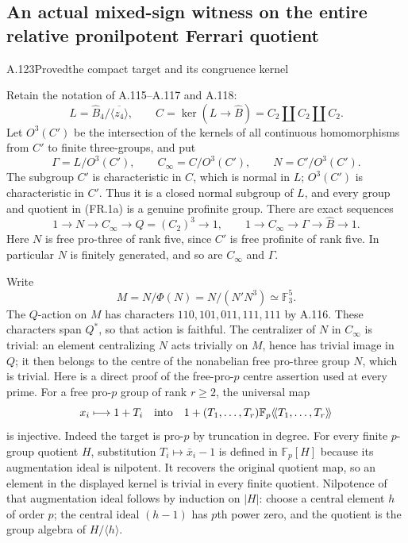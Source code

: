\subsection{An actual mixed-sign witness on the entire relative pronilpotent Ferrari quotient}


\begin{statement}{A.123}{Proved}{the compact target and its congruence kernel}
\end{statement}
Retain the notation of A.115--A.117 and A.118:
\[
 L=\widehat B_4/\overline{\langle z_4\rangle},\qquad
 C=\ker(L\longrightarrow\widehat B)
      =C_2\amalg C_2\amalg C_2.
\]
Let $O^3(C')$ be the intersection of the kernels of all continuous
homomorphisms from $C'$ to finite three-groups, and put
\[
 \Gamma=L/O^3(C'),\qquad
 C_\infty=C/O^3(C'),\qquad
 N=C'/O^3(C').
 \tag{FR.1a}
\]
The subgroup $C'$ is characteristic in $C$, which is normal in $L$;
$O^3(C')$ is characteristic in $C'$. Thus it is a closed normal
subgroup of $L$, and every group and quotient in (FR.1a) is a
genuine profinite group. There are exact sequences
\[
 1\longrightarrow N\longrightarrow C_\infty
 \longrightarrow Q=(C_2)^3\longrightarrow1,
 \qquad
 1\longrightarrow C_\infty\longrightarrow\Gamma
 \longrightarrow\widehat B\longrightarrow1.
 \tag{FR.1b}
\]
Here $N$ is free pro-three of rank five, since $C'$ is free
profinite of rank five. In particular $N$ is finitely generated,
and so are $C_\infty$ and $\Gamma$.

Write
\[
 M=N/\Phi(N)=N/(N'N^3)\simeq\mathbb F_3^5.
\]
The $Q$-action on $M$ has characters $110,101,011,111,111$
by A.116. These characters span $Q^*$, so that action is faithful.
The centralizer of $N$ in $C_\infty$ is trivial: an element
centralizing $N$ acts trivially on $M$, hence has trivial image
in $Q$; it then belongs to the centre of the nonabelian free
pro-three group $N$, which is trivial. Here is a direct
proof of the free-pro-$p$ centre assertion used at every prime.
For a free pro-$p$ group of rank $r\geq2$, the universal map
\[
 x_i\longmapsto1+T_i
 \quad\hbox{into}\quad
 1+(T_1,\ldots,T_r)\mathbb F_p\langle\!\langle
 T_1,\ldots,T_r\rangle\!\rangle
\]
is injective. Indeed the target is pro-$p$ by truncation in
degree. For every finite $p$-group quotient $H$, substitution
$T_i\mapsto\bar x_i-1$ is defined in $\mathbb F_p[H]$
because its augmentation ideal is nilpotent. It recovers
the original quotient map, so an element in the displayed
kernel is trivial in every finite quotient. Nilpotence of
that augmentation ideal follows by induction on $|H|$:
choose a central element $h$ of order $p$; the central ideal
$(h-1)$ has $p$th power zero, and the quotient is the group
algebra of $H/\langle h\rangle$.

